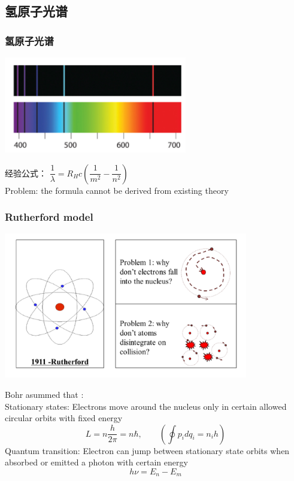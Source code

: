 \subsection{氢原子光谱}

\begin{frame}  
     \frametitle{氢原子光谱}
     \begin{center}
        \includegraphics[width=0.6\textwidth]{figs/2022-01-17-14-02-45.png}
    \end{center}  
    经验公式：
       $\dfrac{1}{\lambda}=R_H c (\dfrac{1}{m^2} -\dfrac{1}{n^2})$ \\ \vspace{0.3em}
    \alert{Problem:} the formula cannot be derived from existing theory
\end{frame}

\begin{frame} 
    \frametitle{Rutherford model}  
    \begin{center}
        \includegraphics[width=0.8\textwidth]{figs/utherford_atom.png}
    \end{center}  
\end{frame}

\begin{frame}  
    \begin{tcolorbox4}
    Bohr asummed that :\\
    {\Bullet} Stationary states: Electrons move around the nucleus only in certain allowed circular orbits with fixed energy \\
    \[ L=n \frac{h}{2\pi}= n \hbar,\qquad (\oint p_i dq_i = n_i h)\]
    {\Bullet} Quantum transition: Electron can jump between stationary state orbits when absorbed or emitted a photon with certain energy\\
    \[ h\nu=E_n -E_m \]
    \end{tcolorbox4}
\end{frame}

